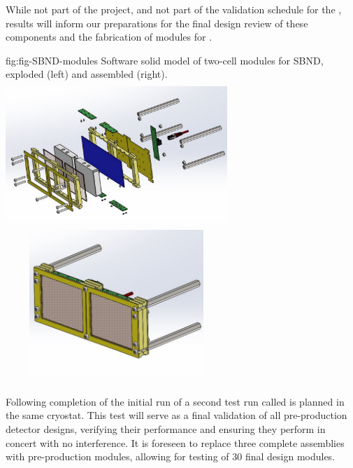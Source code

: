 While not part of the  project, and not part of the validation schedule for the ,  results will inform our preparations for the final design review of these components and the fabrication of modules for .  



\begin{dunefigure}
 {fig:fig-SBND-modules}
 {Software solid model of two-cell  modules for SBND, exploded (left) and assembled (right).}
\includegraphics[angle=0,width=8.4cm,height=5.5cm]{graphics/pds-sbnd-xarapu-exploded.pdf}
\includegraphics[angle=0,width=8.4cm,height=5.5cm]{graphics/pds-sbnd-xarapu-assembled.pdf}
\end{dunefigure}



\subsubsection{}
\label{sec:valid-pdune2}


Following completion of the initial run of  a second test run called  is planned in the same cryostat.  This test will serve as a final validation of all pre-production  detector designs, verifying their performance and ensuring they perform in concert with no interference.  It is foreseen to replace three complete  assemblies with pre-production modules, allowing for testing of \num{30} final design  modules.  

